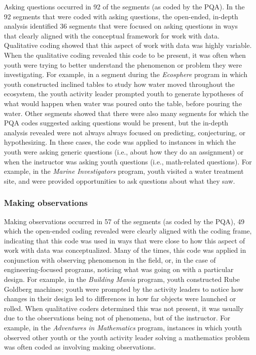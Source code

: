\documentclass[]{msu-thesis}
\theoremstyle{definition}
\theoremstyle{definition}
\theoremstyle{definition}
\theoremstyle{remark}
\begin{document}
Asking questions occurred in 92 of the segments (as coded by the PQA).
In the 92 segments that were coded with asking questions, the
open-ended, in-depth analysis identified 36 segments that were focused
on asking questions in ways that clearly aligned with the conceptual
framework for work with data. Qualitative coding showed that this aspect
of work with data was highly variable. When the qualitative coding
revealed this code to be present, it was often when youth were trying to
better understand the phenomenon or problem they were investigating. For
example, in a segment during the \emph{Ecosphere} program in which youth
constructed inclined tables to study how water moved throughout the
ecosystem, the youth activity leader prompted youth to generate
hypotheses of what would happen when water was poured onto the table,
before pouring the water. Other segments showed that there were also
many segments for which the PQA codes suggested asking questions would
be present, but the in-depth analysis revealed were not always always
focused on predicting, conjecturing, or hypothesizing. In these cases,
the code was applied to instances in which the youth were asking generic
questions (i.e., about how they do an assignment) or when the instructor
was asking youth questions (i.e., math-related questions). For example,
in the \emph{Marine Investigators} program, youth visited a water
treatment site, and were provided opportunities to ask questions about
what they saw.

\subsubsection{Making observations}\label{making-observations}

Making observations occurred in 57 of the segments (as coded by the
PQA), 49 which the open-ended coding revealed were clearly aligned with
the coding frame, indicating that this code was used in ways that were
close to how this aspect of work with data was conceptualized. Many of
the times, this code was applied in conjunction with observing
phenomenon in the field, or, in the case of engineering-focused
programs, noticing what was going on with a particular design. For
example, in the \emph{Building Mania} program, youth constructed Rube
Goldberg machines; youth were prompted by the activity leaders to notice
how changes in their design led to differences in how far objects were
launched or rolled. When qualitative coders determined this was not
present, it was usually due to the observations being not of phenomena,
but of the instructor. For example, in the \emph{Adventures in
Mathematics} program, instances in which youth observed other youth or
the youth activity leader solving a mathematics problem was often coded
as involving making observations.
\end{document}

